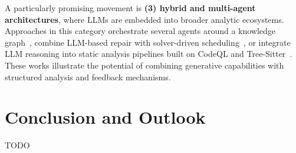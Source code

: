 \documentclass[sigconf,review,anonymous]{acmart}
\begin{document}
A particularly promising movement is \textbf{(3) hybrid and multi-agent architectures}, where LLMs are embedded into broader analytic ecosystems. Approaches in this category orchestrate several agents around a knowledge graph~\cite{DBLP:conf/icse/XuMZZCHLW25:CKGFuzzer}, combine LLM-based repair with solver-driven scheduling~\cite{DBLP:journals/corr/abs-2507-18289:Scheduzz}, or integrate LLM reasoning into static analysis pipelines built on CodeQL and Tree-Sitter~\cite{DBLP:journals/corr/abs-2505-03425:HGFuzzer}. These works illustrate the potential of combining generative capabilities with structured analysis and feedback mechanisms.


\section{Conclusion and Outlook}
TODO




\end{document}
